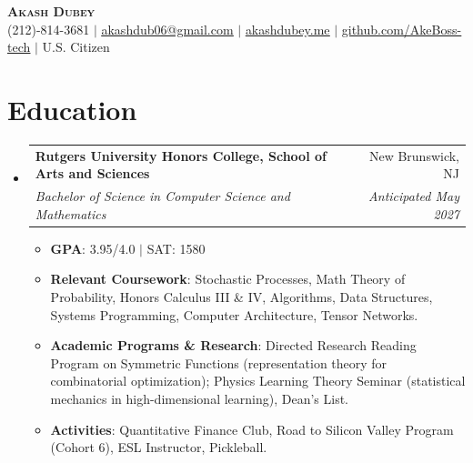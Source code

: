 \documentclass[letterpaper,11pt]{article}
\makeatletter
\newcommand{\resumeItem}[1]{
  \item\small{
    {#1 \vspace{-2pt}}
  }
}
\newcommand{\resumeSubheading}[4]{
  \vspace{-2pt}\item
    \begin{tabular*}{0.97\textwidth}[t]{l@{\extracolsep{\fill}}r}
      \textbf{#1} & #2 \\
      \textit{\small#3} & \textit{\small #4} \\
    \end{tabular*}\vspace{-7pt}
}
\newcommand{\resumeSubHeadingListStart}{\begin{itemize}[leftmargin=0.15in, label={}]}
\newcommand{\resumeSubHeadingListEnd}{\end{itemize}}
\newcommand{\resumeItemListStart}{\begin{itemize}}
\newcommand{\resumeItemListEnd}{\end{itemize}\vspace{-5pt}}
\makeatother
\begin{document}
\begin{center}
    \textbf{\Huge \scshape Akash Dubey} \\ \vspace{1pt}
    \small (212)-814-3681 $|$ \href{mailto:akashdub06@gmail.com}{\underline{akashdub06@gmail.com}} $|$
    \href{https://akashdubey.me/}{\underline{akashdubey.me}} $|$
    \href{https://github.com/AkeBoss-tech}{\underline{github.com/AkeBoss-tech}} $|$
    \small U.S. Citizen
\end{center}
\section{Education}
  \resumeSubHeadingListStart
    \resumeSubheading
      {Rutgers University Honors College, School of Arts and Sciences}{New Brunswick, NJ}
      {Bachelor of Science in Computer Science and Mathematics}{Anticipated May 2027}
      \resumeItemListStart
        \resumeItem{\textbf{GPA}: 3.95/4.0 $|$ SAT: 1580}
        \resumeItem{\textbf{Relevant Coursework}: Stochastic Processes, Math Theory of Probability, Honors Calculus III \& IV, Algorithms, Data Structures, Systems Programming, Computer Architecture, Tensor Networks.}
        \resumeItem{\textbf{Academic Programs \& Research}: Directed Research Reading Program on Symmetric Functions (representation theory for combinatorial optimization); Physics Learning Theory Seminar (statistical mechanics in high-dimensional learning), Dean's List.}
        \resumeItem{\textbf{Activities}: Quantitative Finance Club, Road to Silicon Valley Program (Cohort 6), ESL Instructor, Pickleball.}
      \resumeItemListEnd
  \resumeSubHeadingListEnd
\end{document}
